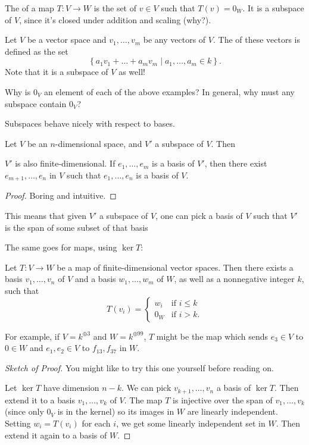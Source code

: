 \begin{example}[Kernels]
	The  of a map $T : V \to W$ is the
	set of $v \in V$ such that $T(v) = 0_W$.
	It is a subspace of $V$, since it's closed under addition and scaling (why?).
\end{example}
\begin{example}[Spans]
	Let $V$ be a vector space and $v_1, \dots, v_m$ be any vectors of $V$.
	The  of these vectors is defined as the set
	\[ \left\{ a_1v_1 + \dots + a_mv_m \mid a_1, \dots, a_m \in k \right\}. \]
	Note that it is a subspace of $V$ as well!
\end{example}
\begin{ques}
	Why is $0_V$ an element of each of the above examples?
	In general, why must any subspace contain $0_V$?
\end{ques}

Subspaces behave nicely with respect to bases.
\begin{theorem}
	Let $V$ be an $n$-dimensional space, and $V'$ a subspace of $V$.
	Then 
	\begin{enumerate}[(a)]
		\ii $V'$ is also finite-dimensional.
		\ii If $e_1, \dots, e_m$ is a basis of $V'$, then there exist
		$e_{m+1}, \dots, e_n$ in $V$ such that
		$e_1, \dots, e_n$ is a basis of $V$.
	\end{enumerate}
\end{theorem}
\begin{proof}
	Boring and intuitive.
\end{proof}
This means that given $V'$ a subspace of $V$,
one can pick a basis of $V$ such that
$V'$ is the span of some subset of that basis

The same goes for maps, using $\ker T$:
\begin{theorem}
	Let $T:V\to W$ be a map of finite-dimensional vector spaces. 
	Then there exists a basis $v_1, \dots, v_n$ of $V$
	and a basis $w_1, \dots, w_m$ of $W$,
	as well as a nonnegative integer $k$, such that
	\[
		T(v_i) =
		\begin{cases}
			w_i & \text{if $i \le k$} \\
			0_W & \text{if $i > k$}.
		\end{cases}
	\]
	\label{thm:linear_map_basis}
\end{theorem}
For example, if $V = k^{\oplus 3}$ and $W = k^{\oplus 99}$,
$T$ might be the map which sends $e_3 \in V$ to $0 \in W$
and $e_1, e_2 \in V$ to $f_{13}, f_{37}$ in $W$.
\begin{proof}[Sketch of Proof]
	You might like to try this one yourself before reading on.

	Let $\ker T$ have dimension $n-k$.
	We can pick $v_{k+1}, \dots, v_{n}$ a basis of $\ker T$.
	Then extend it to a basis $v_1, \dots, v_k$ of $V$.
	The map $T$ is injective over the span of $v_1, \dots, v_k$
	(since only $0_V$ is in the kernel) so its images in $W$ are linearly independent.
	Setting $w_i = T(v_i)$ for each $i$,
	we get some linearly independent set in $W$.
	Then extend it again to a basis of $W$.
\end{proof}


